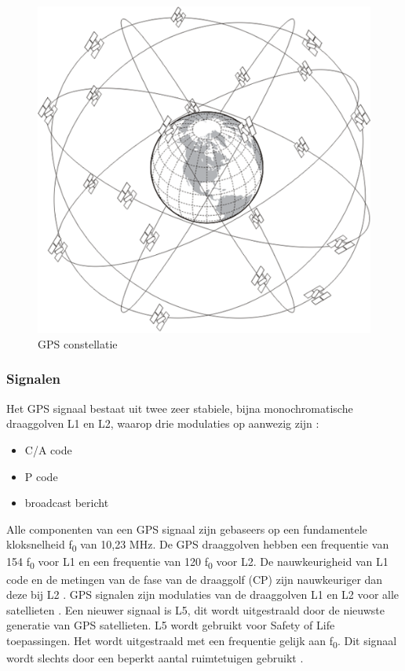  \begin{figure}[hpb]
 	\includegraphics[scale=0.95]{GPS.png}
 	\caption{GPS constellatie \cite{LImgGPS}}
 	\label{imgGPS}
 \end{figure}

\subsubsection{Signalen}
Het GPS signaal bestaat uit twee zeer stabiele, bijna monochromatische draaggolven L1 en L2, waarop drie modulaties op aanwezig zijn \cite{LBibBeiDou4}:
\begin{itemize}
	\item C/A code
	\item P code
	\item broadcast bericht
\end{itemize}
Alle componenten van een GPS signaal zijn gebaseers op een fundamentele kloksnelheid f\textsubscript{0} van 10,23 MHz. De GPS draaggolven hebben een frequentie van 154 f\textsubscript{0} voor L1 en een frequentie van 120 f\textsubscript{0} voor L2\cite{LBibGPS2}. De nauwkeurigheid van L1 code en de metingen van de fase van de draaggolf (CP) zijn nauwkeuriger dan deze bij L2 \cite{LBibBeiDou4}. GPS signalen zijn modulaties van de draaggolven L1 en L2 voor alle satellieten \cite{LBibGPS3}. Een nieuwer signaal is L5, dit wordt uitgestraald door de nieuwste generatie van GPS satellieten. L5 wordt gebruikt voor Safety of Life toepassingen. Het wordt uitgestraald met een frequentie gelijk aan f\textsubscript{0}. Dit signaal wordt slechts door een beperkt aantal ruimtetuigen gebruikt \cite{LBibGNSS9}.

